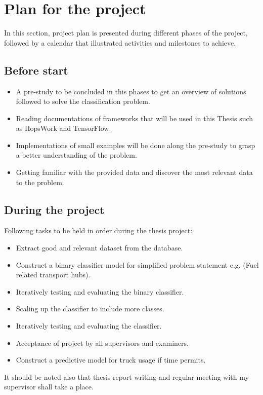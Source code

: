 \documentclass[paper=a4, fontsize=10pt,margin=0.2in]{scrartcl}
\numberwithin{equation}{section}		%
\numberwithin{figure}{section}			%
\numberwithin{table}{section}				%
\begin{document}
\section{Plan for the project}
In this section, project plan is presented during different phases of the project, followed by a calendar that illustrated activities and milestones to achieve.
\subsection{Before start}
\begin{itemize}
\item A pre-study to be concluded in this phases to get an overview of solutions followed to solve the classification problem.
\item Reading documentations of frameworks that will be used in this Thesis such as HopsWork and TensorFlow.
\item Implementations of small examples will be done along the pre-study to grasp a better understanding of the problem.
\item Getting familiar with the provided data and discover the most relevant data to the problem.
\end{itemize}
\subsection{During the project}
Following tasks to be held in order during the thesis project:
\begin{itemize}
\item Extract good and relevant dataset from the database.
\item Construct a binary classifier model for simplified problem statement e.g. (Fuel related transport hubs).
\item Iteratively testing and evaluating the binary classifier.
\item Scaling up the classifier to include more classes.
\item Iteratively testing and evaluating the classifier.
\item Acceptance of project by all supervisors and examiners. 

\item Construct a predictive model for truck usage if time permits.
\end{itemize}
It should be noted also that thesis report writing and regular meeting with my supervisor shall take a place.
\end{document}
